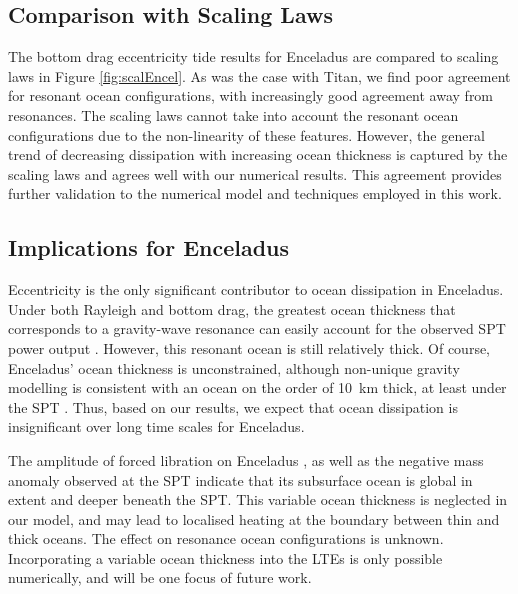 \subsection{Comparison with Scaling Laws}

The bottom drag eccentricity tide results for Enceladus are compared to \citet{chen2013tidal} scaling laws in Figure \ref{fig:scalEncel}. As was the case with Titan, we find poor agreement for resonant ocean configurations, with increasingly good agreement away from resonances. The scaling laws cannot take into account the resonant ocean configurations due to the non-linearity of these features. However, the general trend of decreasing dissipation with increasing ocean thickness is captured by the scaling laws and agrees well with our numerical results. This agreement provides further validation to the numerical model and techniques employed in this work.

\subsection{Implications for Enceladus}

Eccentricity is the only significant contributor to ocean dissipation in Enceladus. Under both Rayleigh and bottom drag, the greatest ocean thickness that corresponds to a gravity-wave resonance can easily account for the observed SPT power output \citep{spencer2006cassini,howett2011high,spencer2013new}. However, this resonant ocean is still relatively thick. Of course, Enceladus' ocean thickness is unconstrained, although non-unique gravity modelling is consistent with an ocean on the order of \SI{10}{\kilo\metre} thick, at least under the SPT \citep{iess2014gravity}. Thus, based on our results, we expect that ocean dissipation is insignificant over long time scales for Enceladus. 

The amplitude of forced libration on Enceladus \citep{thomas2015enceladus}, as well as the negative mass anomaly observed at the SPT \citep{iess2014gravity, mckinnon2015effect} indicate that its subsurface ocean is global in extent and deeper beneath the SPT. This variable ocean thickness is neglected in our model, and may lead to localised heating at the boundary between thin and thick oceans. The effect on resonance ocean configurations is unknown. Incorporating a variable ocean thickness into the LTEs is only possible numerically, and will be one focus of future work.


